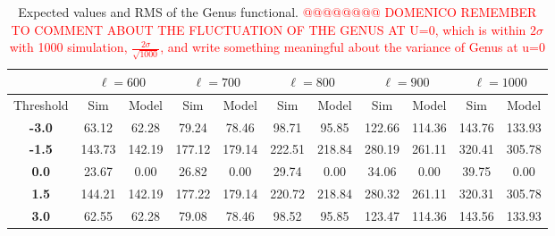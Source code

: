 \documentclass[aps,prd,showpacs,superscriptaddress,groupedaddress]{revtex4-1}  %
\begin{document}
\begin{table}
\begin{tabular}{|c||c|c|c|c|c|c|c|c|c|c|}
& \multicolumn{2}{c|}{$\ell=600$} & \multicolumn{2}{c|}{$\ell=700$} & \multicolumn{2}{c|}{$\ell=800$} & \multicolumn{2}{c|}{$\ell=900$} & \multicolumn{2}{c|}{$\ell=1000$}\\ 
 \hline
Threshold & Sim & Model & Sim & Model & Sim & Model & Sim & Model & Sim & Model\\ 
 \hline
\textbf{-3.0} & 63.12 & 62.28 & 79.24 & 78.46 & 98.71 & 95.85 & 122.66 & 114.36 & 143.76 & 133.93\\
\textbf{-1.5} & 143.73 & 142.19 & 177.12 & 179.14 & 222.51 & 218.84 & 280.19 & 261.11 & 320.41 & 305.78\\
\textbf{0.0} & 23.67 & 0.00 & 26.82 & 0.00 & 29.74 & 0.00 & 34.06 & 0.00 & 39.75 & 0.00\\
\textbf{1.5} & 144.21 & 142.19 & 177.22 & 179.14 & 220.72 & 218.84 & 280.32 & 261.11 & 320.31 & 305.78\\
\textbf{3.0} & 62.55 & 62.28 & 79.08 & 78.46 & 98.52 & 95.85 & 123.47 & 114.36 & 143.56 & 133.93\\
\hline 
\end{tabular} \\
\caption{Expected values and RMS of the Genus functional.
\textcolor{red}{@@@@@@@@ DOMENICO REMEMBER TO COMMENT ABOUT THE FLUCTUATION OF THE GENUS AT U=0, which is within $2\sigma$ with 1000 simulation,  $\frac{2\sigma}{\sqrt{1000}}$, and write something meaningful about the variance of Genus at u=0}
}  \\
\label{tab:genus_mean_rms} \\
\end{table}
\end{document}
